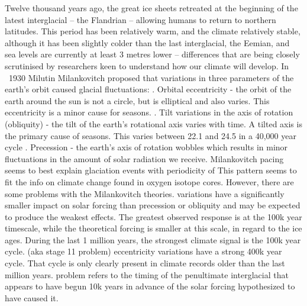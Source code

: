 		\ddd Twelve thousand years ago, the great ice sheets retreated at the beginning of the latest interglacial – the Flandrian – allowing humans to return to northern latitudes. This period has been relatively warm, and the climate relatively stable, although it has been slightly colder than the last interglacial, the Eemian, and sea levels are currently at least 3 metres lower – differences that are being closely scrutinised by researchers keen to understand how our climate will develop.
     \ddd In ~1930 Milutin Milankovitch proposed that variations in three parameters of the earth's orbit caused glacial fluctuations: 
     .	Orbital eccentricity - the orbit of the earth around the sun is not a circle, but is elliptical and also varies. This eccentricity is a minor cause for seasons.
     .	Tilt variations in the axis of rotation (obliquity) - the tilt of the earth's rotational axis varies with time. A tilted axis is the primary cause of seasons. This varies between 22.1 and 24.5 in a 40,000 year cycle
     .	Precession - the earth's axis of rotation wobbles which results in minor fluctuations in the amount of solar radiation we receive.
     \ddd Milankovitch pacing seems to best explain glaciation events with periodicity of  This pattern seems to fit the info on climate change found in oxygen isotope cores. However, there are some problems with the Milankovitch theories.
     \ddd {} variations have a significantly smaller impact on solar forcing than precession or obliquity and may be expected to produce the weakest effects. The greatest observed response is at the 100k year timescale, while the theoretical forcing is smaller at this scale, in regard to the ice ages. During the last 1 million years, the strongest climate signal is the 100k year cycle.
     \ddd {} (aka stage 11 problem) eccentricity variations have a strong 400k year cycle. That cycle is only clearly present in climate records older than the last million years.
     \ddd {} problem refers to the timing of the penultimate interglacial that appears to have begun 10k years in advance of the solar forcing hypothesized to have caused it.